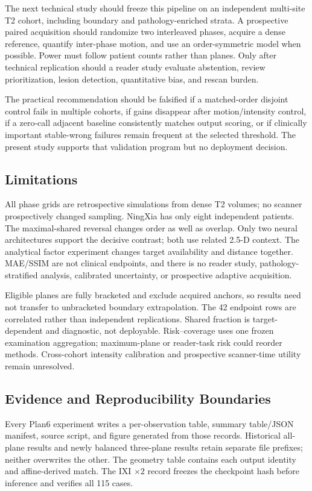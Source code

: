 \documentclass[journal,10pt]{IEEEtran}
\begin{document}
The next technical study should freeze this pipeline on an independent multi-site T2 cohort, including boundary and pathology-enriched strata. A prospective paired acquisition should randomize two interleaved phases, acquire a dense reference, quantify inter-phase motion, and use an order-symmetric model when possible. Power must follow patient counts rather than planes. Only after technical replication should a reader study evaluate abstention, review prioritization, lesion detection, quantitative bias, and rescan burden.

The practical recommendation should be falsified if a matched-order disjoint control fails in multiple cohorts, if gains disappear after motion/intensity control, if a zero-call adjacent baseline consistently matches output scoring, or if clinically important stable-wrong failures remain frequent at the selected threshold. The present study supports that validation program but no deployment decision.

\subsection{Limitations}
All phase grids are retrospective simulations from dense T2 volumes; no scanner prospectively changed sampling. NingXia has only eight independent patients. The maximal-shared reversal changes order as well as overlap. Only two neural architectures support the decisive contrast; both use related 2.5-D context. The analytical factor experiment changes target availability and distance together. MAE/SSIM are not clinical endpoints, and there is no reader study, pathology-stratified analysis, calibrated uncertainty, or prospective adaptive acquisition.

Eligible planes are fully bracketed and exclude acquired anchors, so results need not transfer to unbracketed boundary extrapolation. The 42 endpoint rows are correlated rather than independent replications. Shared fraction is target-dependent and diagnostic, not deployable. Risk--coverage uses one frozen examination aggregation; maximum-plane or reader-task risk could reorder methods. Cross-cohort intensity calibration and prospective scanner-time utility remain unresolved.

\subsection{Evidence and Reproducibility Boundaries}
Every Plan6 experiment writes a per-observation table, summary table/JSON manifest, source script, and figure generated from those records. Historical all-plane results and newly balanced three-plane results retain separate file prefixes; neither overwrites the other. The geometry table contains each output identity and affine-derived match. The IXI $\times2$ record freezes the checkpoint hash before inference and verifies all 115 cases.
\end{document}
